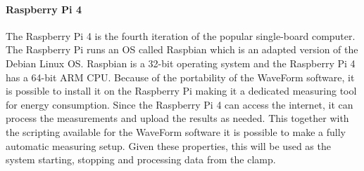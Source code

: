 \paragraph*{Raspberry Pi 4}
The Raspberry Pi 4\cite{RaspberryPi4} is the fourth iteration of the popular single-board computer. The Raspberry Pi runs an OS called Raspbian which is an adapted version of the Debian Linux OS. Raspbian is a 32-bit operating system and the Raspberry Pi 4 has a 64-bit ARM CPU.\cite{RaspberryPi4} Because of the portability of the WaveForm software, it is possible to install it on the Raspberry Pi making it a dedicated measuring tool for energy consumption. Since the Raspberry Pi 4 can access the internet, it can process the measurements and upload the results as needed. This together with the scripting available for the WaveForm software it is possible to make a fully automatic measuring setup. Given these properties, this will be used as the system starting, stopping and processing data from the clamp.